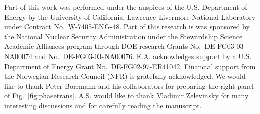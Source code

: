 \documentclass[sort&compress,final,numberedheadings]{aipproc}
\begin{document}
\begin{theacknowledgments}
Part of this work was performed under the auspices of the U.S. Department of 
Energy by the University of California, Lawrence Livermore National Laboratory
under Contract No.\ W-7405-ENG-48\@. Part of this research is was sponsored by 
the National Nuclear Security Administration under the Stewardship Science
Academic Alliances program through DOE research Grants No.\ DE-FG03-03-NA00074 
and No.\ DE-FG03-03-NA00076\@. E.A. acknowledges support by a U.S. Department 
of Energy Grant No.\ DE-FG02-97-ER41042\@. Financial support from the Norwegian
Research Council (NFR) is gratefully acknowledged. We would like to thank Peter
Borrmann and his collaborators for preparing the right panel of Fig.\ 
\ref{fig:phasetrans}. A.S. would like to thank Vladimir Zelevinsky for many 
interesting discussions and for carefully reading the manuscript.
\end{theacknowledgments}


\end{document}
